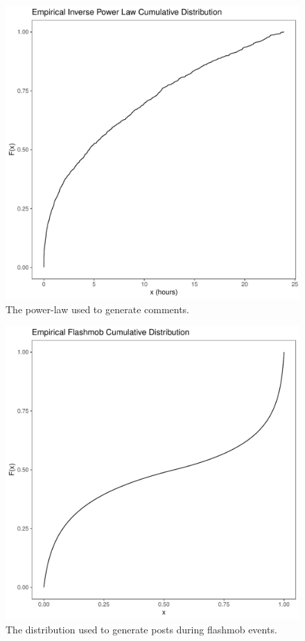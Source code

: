 \begin{figure}[H]
  \centering
  \includegraphics[scale=\yedscale]{figures/comments_power_law}
  \caption{The power-law used to generate comments.}
  \label{fig:comments_dist}
\end{figure}

\begin{figure}[H]
  \centering
  \includegraphics[scale=\yedscale]{figures/flashmob_dist}
  \caption{The distribution used to generate posts during flashmob events.}
  \label{fig:flashmob_dist}
\end{figure}

